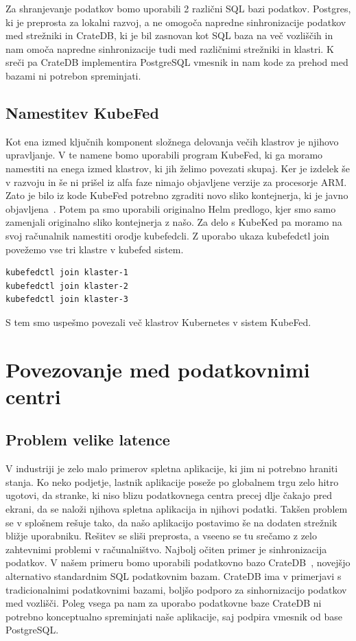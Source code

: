 \documentclass[a4paper, 12pt]{book}
\begin{document}
Za shranjevanje podatkov bomo uporabili 2 različni SQL bazi podatkov.
Postgres, ki je preprosta za lokalni razvoj, a ne omogoča napredne sinhronizacije podatkov med strežniki in CrateDB, ki je bil zasnovan kot SQL baza na več vozliščih in nam omoča napredne sinhronizacije tudi med različnimi strežniki in klastri.
K sreči pa CrateDB implementira PostgreSQL vmesnik in nam kode za prehod med bazami ni potrebon spreminjati.
\section{Namestitev KubeFed}
Kot ena izmed ključnih komponent složnega delovanja večih klastrov je njihovo upravljanje.
V te namene bomo uporabili program KubeFed, ki ga moramo namestiti na enega izmed klastrov, ki jih želimo povezati skupaj.
Ker je izdelek še v razvoju in še ni prišel iz alfa faze nimajo objavljene verzije za procesorje ARM.
Zato je bilo iz kode KubeFed potrebno zgraditi novo sliko kontejnerja, ki je javno objavljena~\cite{docker-kubefed}.
Potem pa smo uporabili originalno Helm predlogo, kjer smo samo zamenjali originalno sliko kontejnerja z našo.
Za delo s KubeKed pa moramo na svoj računalnik namestiti orodje kubefedcli.
Z uporabo ukaza kubefedctl join povežemo vse tri klastre v kubefed sistem.
\begin{verbatim}
kubefedctl join klaster-1
kubefedctl join klaster-2
kubefedctl join klaster-3
\end{verbatim}
S tem smo uspešmo povezali več klastrov Kubernetes v sistem KubeFed.
\chapter{Povezovanje med podatkovnimi centri}
\label{povezovanje-med-centri}
\section{Problem velike latence}
V industriji je zelo malo primerov spletna aplikacije, ki jim ni potrebno hraniti stanja. 
Ko neko podjetje, lastnik aplikacije poseže po globalnem trgu zelo hitro ugotovi, da stranke, ki niso blizu podatkovnega centra precej dlje čakajo pred ekrani, da se naloži njihova spletna aplikacija in njihovi podatki.
Takšen problem se v splošnem rešuje tako, da našo aplikacijo postavimo še na dodaten strežnik bližje uporabniku. 
Rešitev se sliši preprosta, a vseeno se tu srečamo z zelo zahtevnimi problemi v računalništvo.
Najbolj očiten primer je sinhronizacija podatkov.
V našem primeru bomo uporabili podatkovno bazo CrateDB~\cite{cratedb}, novejšjo alternativo standardnim SQL podatkovnim bazam.
CrateDB ima v primerjavi s tradicionalnimi podatkovnimi bazami, boljšo podporo za sinhornizacijo podatkov med vozlišči.
Poleg vsega pa nam za uporabo podatkovne baze CrateDB ni potrebno konceptualno spreminjati naše aplikacije, saj podpira vmesnik od base PostgreSQL.
\end{document}
